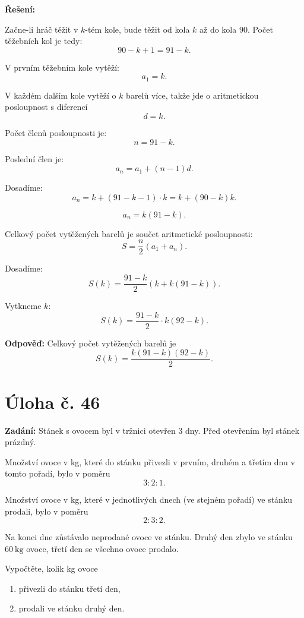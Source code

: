\documentclass[12pt,a4paper]{article}
\begin{document}
\bigskip

\textbf{Řešení:}

Začne-li hráč těžit v \(k\)-tém kole, bude těžit od kola \(k\) až do kola \(90\).  
Počet těžebních kol je tedy:
\[
90-k+1=91-k.
\]

V prvním těžebním kole vytěží:
\[
a_1=k.
\]

V každém dalším kole vytěží o \(k\) barelů více, takže jde o aritmetickou posloupnost s diferencí
\[
d=k.
\]

Počet členů posloupnosti je:
\[
n=91-k.
\]

Poslední člen je:
\[
a_n=a_1+(n-1)d.
\]

Dosadíme:
\[
a_n=k+(91-k-1)\cdot k
= k+(90-k)k.
\]

\[
a_n=k(91-k).
\]

Celkový počet vytěžených barelů je součet aritmetické posloupnosti:
\[
S=\frac{n}{2}(a_1+a_n).
\]

Dosadíme:
\[
S(k)=\frac{91-k}{2}\left(k+k(91-k)\right).
\]

Vytkneme \(k\):
\[
S(k)=\frac{91-k}{2}\cdot k(92-k).
\]

\bigskip

\textbf{Odpověď:}  
Celkový počet vytěžených barelů je
\[
S(k)=\frac{k(91-k)(92-k)}{2}.
\]



\newpage
\section*{Úloha č. 46}

\textbf{Zadání:}  
Stánek s ovocem byl v tržnici otevřen 3 dny. Před otevřením byl stánek prázdný.

Množství ovoce v kg, které do stánku přivezli v prvním, druhém a třetím dnu v tomto pořadí, bylo v poměru
\[
3:2:1.
\]

Množství ovoce v kg, které v jednotlivých dnech (ve stejném pořadí) ve stánku prodali, bylo v poměru
\[
2:3:2.
\]

Na konci dne zůstávalo neprodané ovoce ve stánku. Druhý den zbylo ve stánku \(60\ \mathrm{kg}\) ovoce, třetí den se všechno ovoce prodalo.

Vypočtěte, kolik kg ovoce
\begin{enumerate}
    \item[6.1] přivezli do stánku třetí den,
    \item[6.2] prodali ve stánku druhý den.
\end{enumerate}
\end{document}
